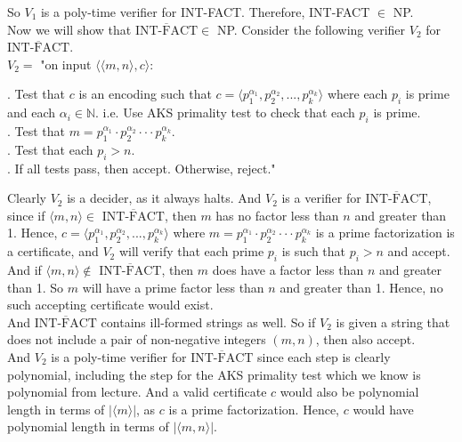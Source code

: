 \documentclass[12pt]{article}
\newcommand{\N}{\mathbb{N}}
\begin{document}
So $V_1$ is a poly-time verifier for INT-FACT. Therefore, INT-FACT $\in$ NP. \\

Now we will show that $\overline{\text{INT-FACT}} \in$ NP. Consider the following verifier $V_2$ for $\overline{\text{INT-FACT}}$. \\

$V_2 = $ "on input $\langle \langle m, n \rangle, c \rangle$: \\

\setlength\parindent{15pt}

. Test that $c$ is an encoding such that $c = \langle p_1^{\alpha_1}, p_2^{\alpha_2},...,p_k^{\alpha_k} \rangle$ where each $p_i$ is prime and \indent each $\alpha_i \in \N$. i.e. Use AKS primality test to check that each $p_i$ is prime. \\

. Test that $m = p_1^{\alpha_1} \cdot p_2^{\alpha_2} \cdot \cdot \cdot p_k^{\alpha_k}$. \\

. Test that each $p_i > n$. \\

. If all tests pass, then accept. Otherwise, reject." \\

\setlength\parindent{0pt}

Clearly $V_2$ is a decider, as it always halts. And $V_2$ is a verifier for $\overline{\text{INT-FACT}}$, since if $\langle m, n \rangle \in$ $\overline{\text{INT-FACT}}$, then $m$ has no factor less than $n$ and greater than 1. Hence, $c = \langle p_1^{\alpha_1}, p_2^{\alpha_2},...,p_k^{\alpha_k} \rangle$ where $m = p_1^{\alpha_1} \cdot p_2^{\alpha_2} \cdot \cdot \cdot p_k^{\alpha_k}$ is a prime factorization is a certificate, and $V_2$ will verify that each prime $p_i$ is such that $p_i > n$ and accept. And if $\langle m,n \rangle \not \in$ $\overline{\text{INT-FACT}}$, then $m$ does have a factor less than $n$ and greater than 1. So $m$ will have a prime factor less than $n$ and greater than 1. Hence, no such accepting certificate would exist. \\

And $\overline{\text{INT-FACT}}$ contains ill-formed strings as well. So if $V_2$ is given a string that does not include a pair of non-negative integers $(m,n)$, then also accept. \\

And $V_2$ is a poly-time verifier for $\overline{\text{INT-FACT}}$ since each step is clearly polynomial, including the step for the AKS primality test which we know is polynomial from lecture. And a valid certificate $c$ would also be polynomial length in terms of $|\langle m \rangle|$, as $c$ is a prime factorization. Hence, $c$ would have polynomial length in terms of $|\langle m,n \rangle|$. \\
\end{document}
